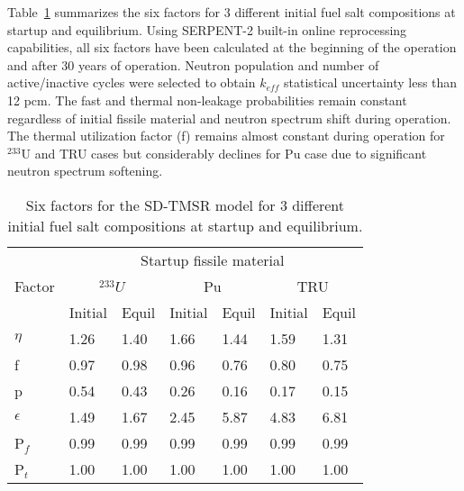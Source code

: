 Table~\ref{tab:six_factor} summarizes the six factors for 3 different initial 
fuel salt compositions at startup and equilibrium. Using SERPENT-2 built-in 
online reprocessing capabilities, all six factors have been calculated at the 
beginning of the operation and after 30 years of operation. Neutron population 
and number of active/inactive cycles were selected to obtain $k_{eff}$ 
statistical uncertainty less than 12 pcm. The fast and thermal non-leakage 
probabilities  remain constant regardless of initial fissile material and 
neutron spectrum shift during operation. The thermal utilization factor (f) 
remains almost constant during operation for $^{233}$U and TRU cases but 
considerably declines for Pu case due to significant neutron spectrum 
softening.
\begin{table} [ht!]
	\caption{Six factors for the SD-TMSR model for 3 different initial 
		fuel salt compositions at startup and equilibrium.}
	\begin{tabularx}{\textwidth}{ X | X X  X X  X X } \hline
		\multirow{3}{*}{Factor}  & \multicolumn{6}{c}{Startup fissile 
			material} \\ \cline{2-7}
		\space  & \multicolumn{2}{c}{$^{233}U$} & \multicolumn{2}{c}{Pu} & 
		\multicolumn{2}{c}{TRU} \\ \cline{2-7}
		\space  & Initial & Equil & Initial & Equil & Initial & Equil \\ \hline
		$\eta$  & 1.26 & 1.40 & 1.66 & 1.44 & 1.59 & 1.31 \\ 
		f       & 0.97 & 0.98 & 0.96 & 0.76 & 0.80 & 0.75 \\
		p       & 0.54 & 0.43 & 0.26 & 0.16 & 0.17 & 0.15 \\
		$\epsilon$ & 1.49 & 1.67 & 2.45 & 5.87 & 4.83 & 6.81 \\
		P$_f$   & 0.99 & 0.99 & 0.99 & 0.99& 0.99 & 0.99 \\
		P$_t$   & 1.00 & 1.00 & 1.00 & 1.00 & 1.00 & 1.00 \\ \hline
	\end{tabularx}
	\label{tab:six_factor}
\end{table}

